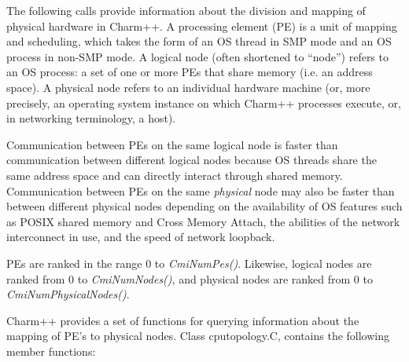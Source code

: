 
The following calls provide information about the division and mapping of
physical hardware in Charm++.
A processing element (PE) is a unit of mapping and scheduling, which takes the
form of an OS thread in SMP mode and an OS process in non-SMP mode.
A logical node (often shortened to ``node'') refers to an OS process: a set of
one or more PEs that share memory (i.e. an address space).
A physical node refers to an individual hardware machine (or, more precisely,
an operating system instance on which Charm++ processes execute, or, in
networking terminology, a host).

Communication between PEs on the same logical node is faster than communication
between different logical nodes because OS threads share the same address
space and can directly interact through shared memory.
Communication between PEs on the same {\em physical} node may also be faster
than between different physical nodes depending on the availability of OS
features such as POSIX shared memory and Cross Memory Attach, the abilities of
the network interconnect in use, and the speed of network loopback.

PEs are ranked in the range 0 to {\em CmiNumPes()}. Likewise, logical nodes are
ranked from 0 to {\em CmiNumNodes()}, and physical nodes are ranked from 0 to
{\em CmiNumPhysicalNodes()}.


Charm++ provides a set of functions for querying information about the mapping of PE's to physical nodes. 
 Class cputopology.C, contains the following member functions:


